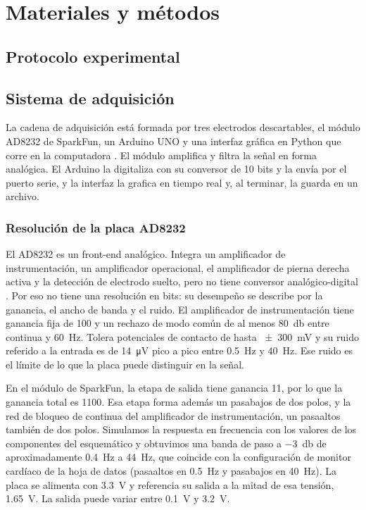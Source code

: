 \section{Materiales y métodos}
\label{sec:metodos}

\subsection{Protocolo experimental}
\label{sec:protocolo}

\subsection{Sistema de adquisición}
\label{sec:adquisicion}

La cadena de adquisición está formada por tres electrodos descartables, el módulo AD8232 de SparkFun, un Arduino UNO y una interfaz gráfica en Python que corre en la computadora \parencite{tassara_ecg}. El módulo amplifica y filtra la señal en forma analógica. El Arduino la digitaliza con su conversor de 10 bits y la envía por el puerto serie, y la interfaz la grafica en tiempo real y, al terminar, la guarda en un archivo.

\subsubsection{Resolución de la placa AD8232}
\label{sec:resolucion}

El AD8232 es un front-end analógico. Integra un amplificador de instrumentación, un amplificador operacional, el amplificador de pierna derecha activa y la detección de electrodo suelto, pero no tiene conversor analógico-digital \parencite{analog_ad8232}. Por eso no tiene una resolución en bits: su desempeño se describe por la ganancia, el ancho de banda y el ruido. El amplificador de instrumentación tiene ganancia fija de 100 y un rechazo de modo común de al menos \SI{80}{\decibel} entre continua y \SI{60}{\hertz}. Tolera potenciales de contacto de hasta \SI{\pm300}{\milli\volt} y su ruido referido a la entrada es de \SI{14}{\micro\volt} pico a pico entre \SI{0.5}{\hertz} y \SI{40}{\hertz}. Ese ruido es el límite de lo que la placa puede distinguir en la señal.

En el módulo de SparkFun, la etapa de salida tiene ganancia 11, por lo que la ganancia total es 1100. Esa etapa forma además un pasabajos de dos polos, y la red de bloqueo de continua del amplificador de instrumentación, un pasaaltos también de dos polos. Simulamos la respuesta en frecuencia con los valores de los componentes del esquemático \parencite{sparkfun_hw} y obtuvimos una banda de paso a \SI{-3}{\decibel} de aproximadamente \SI{0.4}{\hertz} a \SI{44}{\hertz}, que coincide con la configuración de monitor cardíaco de la hoja de datos (pasaaltos en \SI{0.5}{\hertz} y pasabajos en \SI{40}{\hertz}). La placa se alimenta con \SI{3.3}{\volt} y referencia su salida a la mitad de esa tensión, \SI{1.65}{\volt}. La salida puede variar entre \SI{0.1}{\volt} y \SI{3.2}{\volt}.

